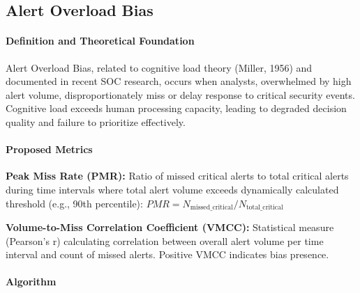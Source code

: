 \documentclass[11pt, a4paper]{article}
\begin{document}
\subsection{Alert Overload Bias}
\label{subsec:alert_overload_bias}

\paragraph{Definition and Theoretical Foundation}
Alert Overload Bias, related to cognitive load theory (Miller, 1956)\cite{miller1956magical} and documented in recent SOC research\cite{gupta2024alert,kearney2023combating}, occurs when analysts, overwhelmed by high alert volume, disproportionately miss or delay response to critical security events. Cognitive load exceeds human processing capacity, leading to degraded decision quality and failure to prioritize effectively.

\paragraph{Proposed Metrics}
\textbf{Peak Miss Rate (PMR):} Ratio of missed critical alerts to total critical alerts during time intervals where total alert volume exceeds dynamically calculated threshold (e.g., 90th percentile): $PMR = N_{\text{missed\_critical}} / N_{\text{total\_critical}}$

\textbf{Volume-to-Miss Correlation Coefficient (VMCC):} Statistical measure (Pearson's r) calculating correlation between overall alert volume per time interval and count of missed alerts. Positive VMCC indicates bias presence.

\paragraph{Algorithm}
\end{document}
